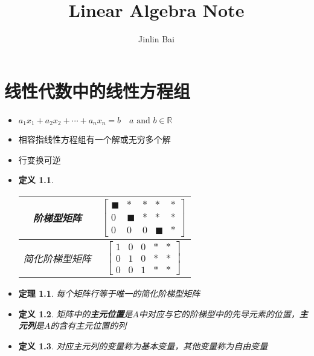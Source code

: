 \documentclass[UTF8]{report}
\author{Jinlin Bai}
\title{Linear Algebra Note}
\newtheorem{define}{定义}
\newtheorem{theorem}{定理}
\begin{document}
	\maketitle
	\tableofcontents
	\newpage

	\chapter{线性代数中的线性方程组}
	\begin{itemize}
		\item $a_1 x_1 + a_2 x_2 + \cdots + a_n x_n = b \quad a \textrm{ and } b\in \mathbb{R}$
		
		\item 相容指线性方程组有一个解或无穷多个解 
		
		\item 行变换可逆
		
		\item \begin{define}
			\begin{tabular}{|c|c|}
				\hline
				阶梯型矩阵 & $\begin{bmatrix}
					\blacksquare & * & * & * & * \\
					0 & \blacksquare & * & * & * \\
					0 & 0 & 0 & \blacksquare & *
				\end{bmatrix}$ \\
				\hline
				简化阶梯型矩阵 & $\begin{bmatrix}
					1 & 0 & 0 & * & * \\
					0 & 1 & 0 & * & * \\
					0 & 0 & 1 & * & *
				\end{bmatrix}$\\
				\hline
			\end{tabular}
		\end{define}
	
		\item \begin{theorem}
			每个矩阵行等于唯一的简化阶梯型矩阵
		\end{theorem}
	
		\item \begin{define}
			矩阵中的\textbf{主元位置}是$A$中对应与它的阶梯型中的先导元素的位置，\textbf{主元列}是$A$的含有\textit{主元位置}的列
		\end{define}
	
		\item \begin{define}
			对应主元列的变量称为基本变量，其他变量称为自由变量
			\end{define}
		

\end{itemize}
\end{document}
